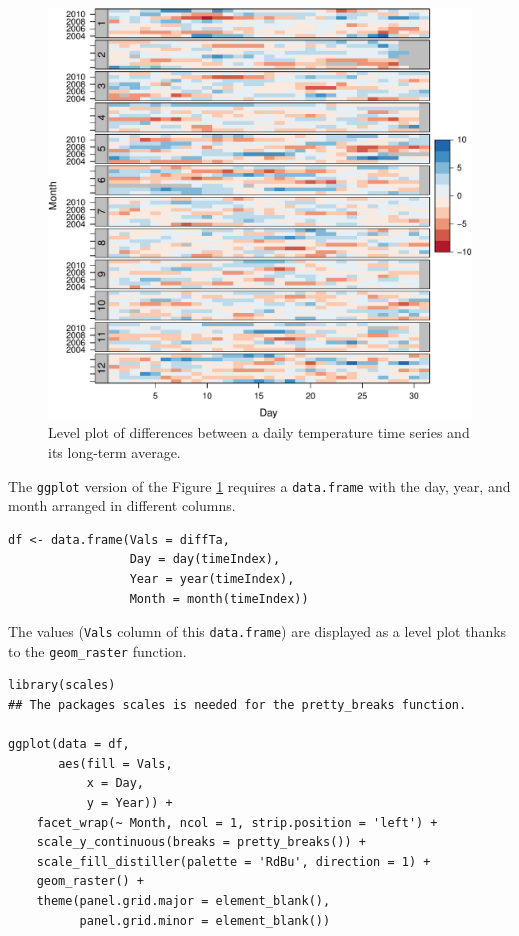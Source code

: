 \begin{figure}[htbp]
\centering
\includegraphics[width=.9\linewidth]{figs/diffTa_levelplot.pdf}
\caption{Level plot of differences between a daily temperature time series and its long-term average. \label{fig:diffTa_level}}
\end{figure}

The \texttt{ggplot} version of the Figure  \ref{fig:diffTa_level} requires a \texttt{data.frame} with the day, year, and month arranged in different columns.
\lstset{language=r,label= ,caption= ,captionpos=b,numbers=none}
\begin{lstlisting}
df <- data.frame(Vals = diffTa,
                 Day = day(timeIndex),
                 Year = year(timeIndex),
                 Month = month(timeIndex))
\end{lstlisting}

The values (\texttt{Vals} column of this \texttt{data.frame}) are displayed as a level plot thanks to the \texttt{geom\_raster} function.
\lstset{language=r,label= ,caption= ,captionpos=b,numbers=none}
\begin{lstlisting}
library(scales) 
## The packages scales is needed for the pretty_breaks function.

ggplot(data = df,
       aes(fill = Vals,
           x = Day,
           y = Year)) +
    facet_wrap(~ Month, ncol = 1, strip.position = 'left') +
    scale_y_continuous(breaks = pretty_breaks()) + 
    scale_fill_distiller(palette = 'RdBu', direction = 1) + 
    geom_raster() +
    theme(panel.grid.major = element_blank(),
          panel.grid.minor = element_blank())
\end{lstlisting}



